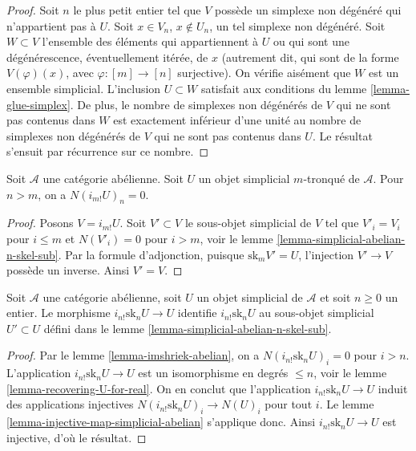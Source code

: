 \begin{proof}
Soit $n$ le plus petit entier tel que $V$ possède un simplexe non dégénéré
qui n'appartient pas à $U$. Soit $x \in V_n$, $x\not \in U_n$, un tel
simplexe non dégénéré. Soit $W \subset V$ l'ensemble des éléments qui
appartiennent à $U$ ou qui sont une dégénérescence, éventuellement
itérée, de $x$ (autrement dit, qui sont de la forme $V(\varphi)(x)$,
avec $\varphi : [m] \to [n]$ surjective). On vérifie aisément que $W$ est
un ensemble simplicial. L'inclusion $U \subset W$ satisfait aux
conditions du lemme \ref{lemma-glue-simplex}. De plus, le nombre de
simplexes non dégénérés de $V$ qui ne sont pas contenus dans $W$ est
exactement inférieur d'une unité au nombre de simplexes non dégénérés de
$V$ qui ne sont pas contenus dans $U$. Le résultat s'ensuit par récurrence
sur ce nombre.
\end{proof}

\begin{lemma}
\label{lemma-imshriek-abelian}
Soit $\mathcal{A}$ une catégorie abélienne. Soit $U$ un objet simplicial
$m$-tronqué de $\mathcal{A}$. Pour $n > m$, on a $N(i_{m!}U)_n = 0$.
\end{lemma}

\begin{proof}
Posons $V = i_{m!}U$. Soit $V' \subset V$ le sous-objet simplicial de
$V$ tel que $V'_i = V_i$ pour $i \leq m$ et $N(V'_i) = 0$ pour
$i > m$, voir le lemme \ref{lemma-simplicial-abelian-n-skel-sub}.
Par la formule d'adjonction, puisque $\text{sk}_m V' = U$, l'injection
$V' \to V$ possède un inverse. Ainsi $V' = V$.
\end{proof}

\begin{lemma}
\label{lemma-n-skeleton-abelian}
Soit $\mathcal{A}$ une catégorie abélienne, soit $U$ un objet simplicial
de $\mathcal{A}$ et soit $n \geq 0$ un entier. Le morphisme
$i_{n!} \text{sk}_n U \to U$ identifie $i_{n!} \text{sk}_n U$ au
sous-objet simplicial $U' \subset U$ défini dans le lemme
\ref{lemma-simplicial-abelian-n-skel-sub}.
\end{lemma}

\begin{proof}
Par le lemme \ref{lemma-imshriek-abelian}, on a
$N(i_{n!} \text{sk}_n U)_i = 0$ pour $i > n$. L'application
$i_{n!} \text{sk}_n U \to U$ est un isomorphisme en degrés $\leq n$,
voir le lemme \ref{lemma-recovering-U-for-real}. On en conclut que
l'application $i_{n!} \text{sk}_n U \to U$ induit des applications
injectives $N(i_{n!} \text{sk}_n U)_i \to N(U)_i$ pour tout $i$. Le
lemme \ref{lemma-injective-map-simplicial-abelian} s'applique donc. Ainsi
$i_{n!} \text{sk}_n U \to U$ est injective, d'où le résultat.
\end{proof}

